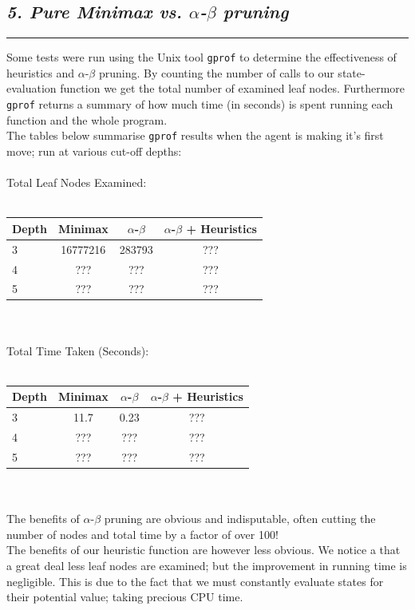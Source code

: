 \documentclass[10pt]{article}
\begin{document}
\begin{multicols}{2}
\subsection*{\emph { \textmd{5. Pure Minimax vs. $\alpha$-$\beta$ pruning}}}
\hrule
\vspace{0.4cm}
Some tests were run using the Unix tool \texttt{gprof} to determine the effectiveness
of heuristics and $\alpha$-$\beta$ pruning. By counting the number of calls
to our state-evaluation function we get the total number of examined leaf nodes.
Furthermore \texttt{gprof} returns a summary of how much time (in seconds) is spent running
each function and the whole program.\\
The tables below summarise \texttt{gprof} results when the agent is making it's first move;
run at various cut-off depths:\\\\
Total Leaf Nodes Examined:\\\\
\begin{tabular}{ | l | c c c | }
  \hline                        
  Depth & Minimax & $\alpha$-$\beta$ & $\alpha$-$\beta$ + Heuristics \\ \hline
  3 & 16777216 & 283793 & ??? \\
  4 & ??? & ??? & ??? \\
  5 & ??? & ??? & ??? \\
  \hline  
\end{tabular}\\\\
Total Time Taken (Seconds):\\\\
\begin{tabular}{ | l | c c c | }
  \hline                        
  Depth & Minimax & $\alpha$-$\beta$ & $\alpha$-$\beta$ + Heuristics \\ \hline
  3 & 11.7 & 0.23 & ??? \\
  4 & ??? & ??? & ??? \\
  5 & ??? & ??? & ??? \\
  \hline  
\end{tabular}\\\\
The benefits of $\alpha$-$\beta$ pruning are obvious and indisputable, often cutting
the number of nodes and total time by a factor of over 100!\\
The benefits of our heuristic function are however less obvious. We notice a that
a great deal less leaf nodes are examined; but the improvement in running time is
negligible. This is due to the fact that we must constantly evaluate states for their
potential value; taking precious CPU time.


\end{multicols}
\end{document}
